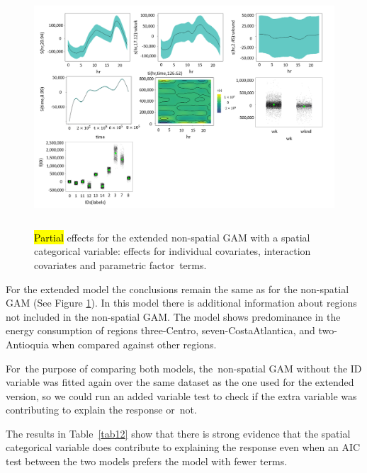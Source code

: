 \documentclass[energies,article,accept,pdftex,moreauthors]{Definitions/mdpi}
\begin{document}
           \begin{figure}[H]
		\includegraphics[height=9cm, width=14.5cm]{figs/Partial_Effects_Plot_Extended.png}
	\caption{\hl{Partial} %
effects for the extended non-spatial GAM with a spatial categorical variable: effects for individual covariates, interaction covariates and parametric factor~terms.	\label{fig:9}}
    \end{figure}
    
    For the extended model the conclusions remain the same as for the non-spatial GAM (See Figure \ref{fig:9}). In this model there is additional information about regions not included in the non-spatial GAM. The model shows predominance in the energy consumption of regions three-Centro, seven-CostaAtlantica, and two-Antioquia when compared against other regions.

   For~the purpose of comparing both models, the~non-spatial GAM without the ID variable was fitted again over the same dataset as the one used for the extended version, so we could run an added variable test to check if the extra variable was contributing to explain the response or~not.
    
    The results in Table~\ref{tab12} show that there is strong evidence that the spatial categorical variable does contribute to explaining the response even when an AIC test between the two models prefers the model with fewer terms. 
    
\end{document}
